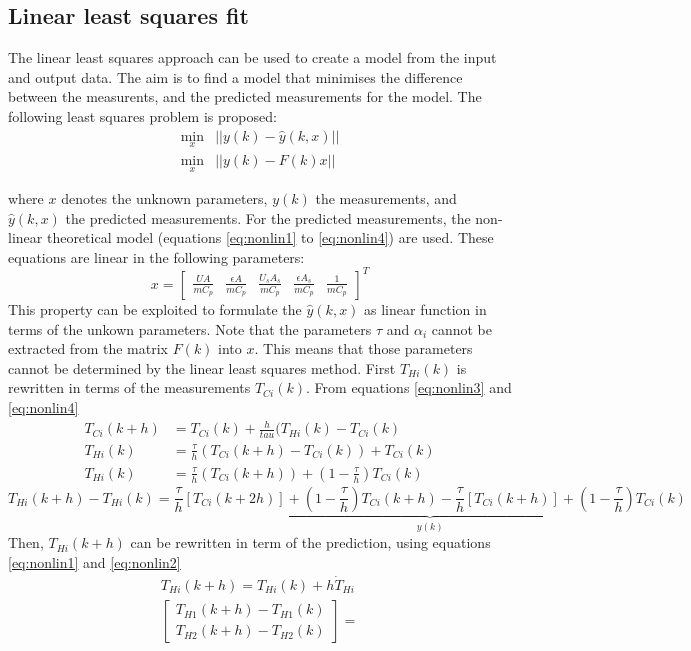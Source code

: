 \subsection{Linear least squares fit}
The linear least squares approach can be used to create a model from the input and output data. The aim is to find a model that minimises the difference between the measurents, and the predicted measurements for the model. The following least squares problem is proposed:
\begin{align}
    \displaystyle \min_{x} &||y(k)-\hat{y}(k,x)|| \nonumber \\
    \displaystyle \min_{x} &||y(k)-F(k)x||\label{eq:leastsquarescost}
\end{align}


where $x$ denotes the unknown parameters, $y(k)$ the measurements, and $\hat{y}(k,x)$ the predicted measurements. For the predicted measurements, the non-linear theoretical model (equations \ref{eq:nonlin1} to \ref{eq:nonlin4}) are used. These equations are linear in the following parameters:
$$
x = \begin{bmatrix}
\frac{UA}{mC_p} & \frac{\epsilon A}{mC_p} & \frac{U_sA_s}{mC_p} & \frac{\epsilon A_s}{mC_p} & \frac{1}{mC_p}
\end{bmatrix}^T
$$
This property can be exploited to formulate the $\hat{y}(k,x)$ as linear function in terms of the unkown parameters. Note that the parameters $\tau$ and $\alpha_i$ cannot be extracted from the matrix $F(k)$ into $x$. This means that those parameters cannot be determined by the linear least squares method.
First $T_{Hi}(k)$ is rewritten in terms of the measurements $T_{Ci}(k)$. From equations \ref{eq:nonlin3} and \ref{eq:nonlin4}
\begin{align*}
    T_{Ci}(k+h) &= T_{Ci}(k) + \frac{h}{tau}(T_{Hi}(k) - T_{Ci}(k)\\
    T_{Hi}(k) &= \frac{\tau}{h}(T_{Ci}(k+h) - T_{Ci}(k)) + T_{Ci}(k)\\
    T_{Hi}(k) &= \frac{\tau}{h}(T_{Ci}(k+h)) + (1-\frac{\tau}{h})T_{Ci}(k)
\end{align*}
\begin{equation}
    T_{Hi}(k+h) - T_{Hi}(k) = \underbrace{\frac{\tau}{h}[T_{Ci}(k+2h)] + (1-\frac{\tau}{h})T_{Ci}(k+h) - \frac{\tau}{h}[T_{Ci}(k+h)] + (1-\frac{\tau}{h})T_{Ci}(k)}_{y(k)} \label{eq:leastsquares1}
\end{equation}
Then, $T_{Hi}(k+h)$ can be rewritten in term of the prediction, using equations \ref{eq:nonlin1} and \ref{eq:nonlin2}
\begin{align*}
    T_{Hi}(k+h) = T_{Hi}(k) + h\dot{T}_{Hi}\\
    \begin{bmatrix}
        T_{H1}(k+h) - T_{H1}(k) \\
        T_{H2}(k+h) - T_{H2}(k)
    \end{bmatrix} = 
\end{align*}
